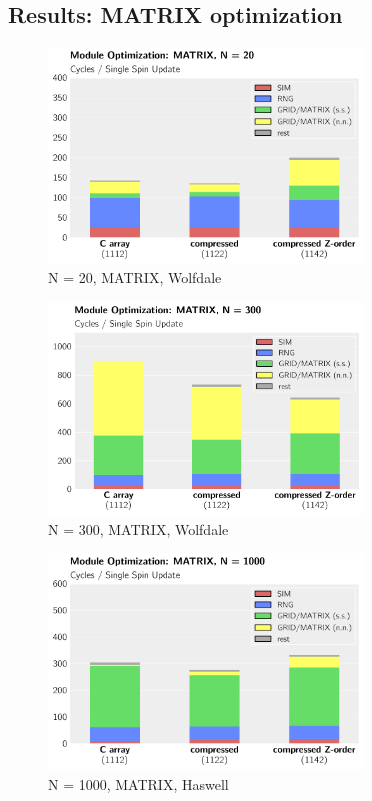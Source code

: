 \documentclass[letterpaper]{article}
\begin{document}
\subsection{Results: MATRIX optimization}
	\begin{figure}[h]\centering
	  \includegraphics[width = 8.36cm]{plots/msk_20_3.pdf}
	  \caption{N = 20, MATRIX, Wolfdale}
	\end{figure}
	\begin{figure}[h]\centering
	  \includegraphics[width = 8.36cm]{plots/msk_300_3.pdf}
	  \caption{N = 300, MATRIX, Wolfdale}
	\end{figure}
	\begin{figure}[h]\centering
	  \includegraphics[width = 8.36cm]{plots/dg_1000_3.pdf}
	  \caption{N = 1000, MATRIX, Haswell}
	\end{figure}
\end{document}
